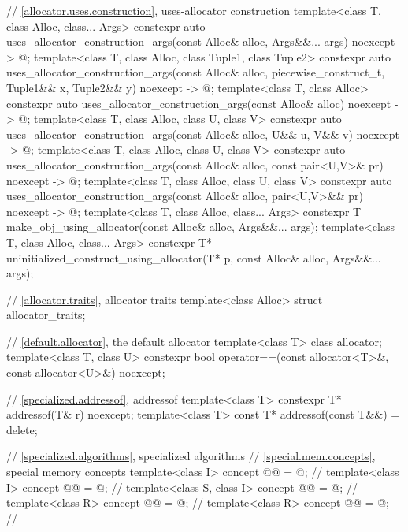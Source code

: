 \begin{codeblock}
{  // \ref{allocator.uses.construction}, uses-allocator construction
  template<class T, class Alloc, class... Args>
    constexpr auto uses_allocator_construction_args(const Alloc& alloc,
                                                    Args&&... args) noexcept -> @\seebelow@;
  template<class T, class Alloc, class Tuple1, class Tuple2>
    constexpr auto uses_allocator_construction_args(const Alloc& alloc, piecewise_construct_t,
                                                    Tuple1&& x, Tuple2&& y)
                                                    noexcept ->  @\seebelow@;
  template<class T, class Alloc>
    constexpr auto uses_allocator_construction_args(const Alloc& alloc) noexcept -> @\seebelow@;
  template<class T, class Alloc, class U, class V>
    constexpr auto uses_allocator_construction_args(const Alloc& alloc,
                                                    U&& u, V&& v) noexcept -> @\seebelow@;
  template<class T, class Alloc, class U, class V>
    constexpr auto uses_allocator_construction_args(const Alloc& alloc,
                                                    const pair<U,V>& pr) noexcept -> @\seebelow@;
  template<class T, class Alloc, class U, class V>
    constexpr auto uses_allocator_construction_args(const Alloc& alloc,
                                                    pair<U,V>&& pr) noexcept -> @\seebelow@;
  template<class T, class Alloc, class... Args>
    constexpr T make_obj_using_allocator(const Alloc& alloc, Args&&... args);
  template<class T, class Alloc, class... Args>
    constexpr T* uninitialized_construct_using_allocator(T* p, const Alloc& alloc,
                                                         Args&&... args);

  // \ref{allocator.traits}, allocator traits
  template<class Alloc> struct allocator_traits;

  // \ref{default.allocator}, the default allocator
  template<class T> class allocator;
  template<class T, class U>
    constexpr bool operator==(const allocator<T>&, const allocator<U>&) noexcept;

  // \ref{specialized.addressof}, addressof
  template<class T>
    constexpr T* addressof(T& r) noexcept;
  template<class T>
    const T* addressof(const T&&) = delete;

  // \ref{specialized.algorithms}, specialized algorithms
  // \ref{special.mem.concepts}, special memory concepts
  template<class I>
    concept @@ = @\seebelow@;    // \expos
  template<class I>
    concept @@ = @\seebelow@;  // \expos
  template<class S, class I>
    concept @@ = @\seebelow@;          // \expos
  template<class R>
    concept @@ = @\seebelow@;       // \expos
  template<class R>
    concept @@ = @\seebelow@;     // \expos

}
\end{codeblock}

